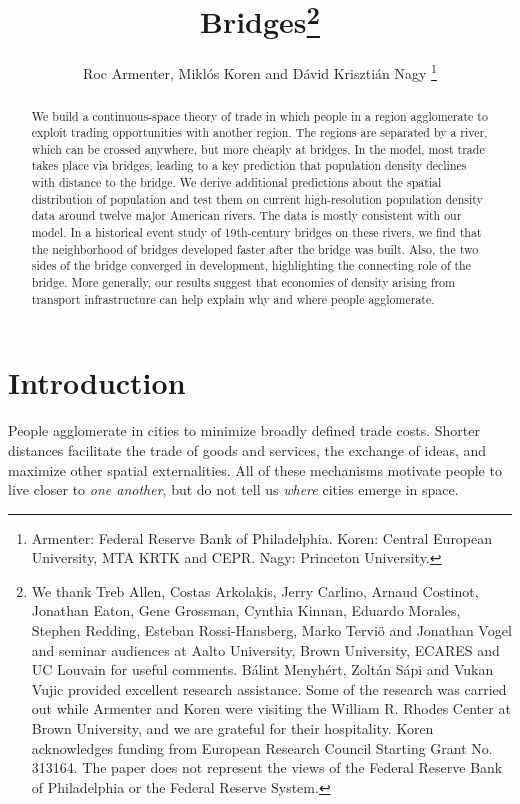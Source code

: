 \documentclass[12pt]{article}
\begin{document}
\title{Bridges\thanks{We thank Treb Allen, Costas Arkolakis, Jerry Carlino, Arnaud Costinot, Jonathan Eaton, Gene Grossman, Cynthia Kinnan, Eduardo Morales, Stephen Redding, Esteban Rossi-Hansberg, Marko Terviö and Jonathan Vogel and seminar audiences at Aalto University, Brown University, ECARES and UC Louvain for useful comments. B\'{a}lint Menyh\'{e}rt, Zolt\'an S\'api and Vukan Vujic provided excellent research assistance. Some of the research was carried out while Armenter and Koren were visiting the William R. Rhodes Center at Brown University, and we are grateful for their hospitality. Koren acknowledges funding from European Research Council Starting Grant No. 313164. The paper does not represent the views of the Federal Reserve Bank of Philadelphia or the Federal Reserve System.}}
\author{Roc Armenter, Mikl\'{o}s Koren and D\'{a}vid Kriszti\'{a}n Nagy%
\thanks{%
Armenter: Federal Reserve Bank of Philadelphia. Koren: Central European
University, MTA KRTK and CEPR. Nagy: Princeton University.}}
\maketitle

\begin{abstract}
We build a continuous-space theory of trade in which people in a region
agglomerate to exploit trading opportunities with another region. The
regions are separated by a river, which can be crossed anywhere, but more
cheaply at bridges. In the model, most trade takes place via bridges,
leading to a key prediction that population density declines with distance
to the bridge. We derive additional predictions about the spatial
distribution of population and test them on current high-resolution population
density data around twelve major American rivers. The data is mostly
consistent with our model. 
In a historical event study of 19th-century bridges on these rivers, we find that the neighborhood of bridges developed faster after the bridge was built. Also, the two sides of the bridge converged in development, highlighting the connecting role of the bridge.
More generally, our results suggest that
economies of density arising from transport infrastructure can help explain
why and where people agglomerate.
\end{abstract}
\newpage
\section{Introduction}

People agglomerate in cities to minimize broadly defined trade costs. Shorter distances facilitate the trade of goods and services, the exchange of ideas, and maximize other spatial externalities. All of these mechanisms motivate people to live closer to \emph{one another}, but do not tell us \emph{where} cities emerge in space.
\end{document}
